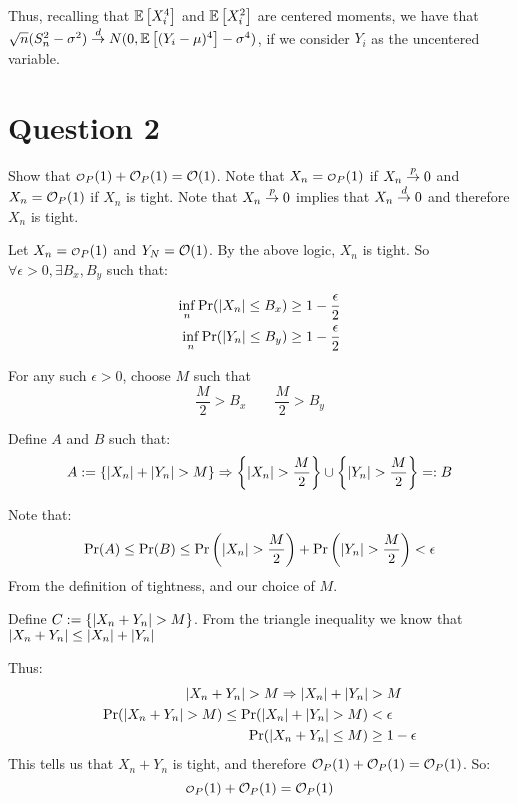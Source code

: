 \documentclass[12pt]{paper}
\begin{document}
Thus, recalling that $\mathbb{E} \left [ X_i^4 \right ]$ and $\mathbb{E} \left [ X_i^2 \right ]$ are centered moments, we have that  $\sqrt{n}(S_n^2-\sigma^2)\overset{d}{\to}N(0,\mathbb{E} \left [ (Y_i-\mu)^4 \right ]-\sigma^4)$, if we consider $Y_i$ as the uncentered variable.

\section*{Question 2}

Show that $\smallO_P(1) + \bigO_P(1) = \bigO(1)$.
\newline\newline
Note that $X_n = \smallO_P(1)$ if $X_n \overset{p}{\to} 0$ and $X_n = \mathcal{O}_P(1)$
if $X_n$ is tight. Note that $X_n \overset{p}{\to} 0$ implies that $X_n \overset{d}{\to}
0$ and therefore $X_n$ is tight.

Let $X_n = \smallO_P(1)$ and $Y_N = \mathcal{O}(1)$. By the above logic,
$X_n$ is tight. So $\forall \epsilon > 0, \exists B_x, B_y$ such that:

\begin{align*}
  \inf_n \Pr( \left \lvert X_n \right \rvert \leq B_x) &\geq 1- \frac{\epsilon}{2}\\
  \inf_n \Pr( \left \lvert Y_n \right \rvert \leq B_y) &\geq 1 - \frac{\epsilon}{2}
\end{align*}

For any such $\epsilon > 0$, choose $M$ such that
\begin{equation*}
  \frac{M}{2} > B_x \quad \quad \frac{M}{2} > B_y
\end{equation*}

Define $A$ and $B$ such that:
\begin{equation*}
  A := \{ \left \lvert X_n \right \rvert + \left \lvert Y_n \right \rvert > M \} \Rightarrow \left \{\left \lvert X_n \right \rvert >
    \frac{M}{2} \right\} \cup
\left\{\left \lvert Y_n \right \rvert > \frac{M}{2} \right\} =: B
\end{equation*}

Note that:
\begin{equation*}
  \Pr( A) \leq \Pr(B) \leq \Pr\left( \left \lvert X_n \right \rvert > \frac{M}{2}\right) + \Pr\left( \left \lvert Y_n \right \rvert > \frac{M}{2}\right) < \epsilon
\end{equation*}
From the definition of tightness, and our choice of $M$. 

Define $C := \{ \left \lvert  X_n + Y_n \right \rvert > M \}$. From the triangle inequality
we know that $\left \lvert X_n + Y_n \right \rvert \leq \left \lvert X_n \right \rvert + \left \lvert Y_n \right \rvert$

Thus:
\begin{align*}
  \left \lvert X_n + Y_n \right \rvert > M \Rightarrow \left \lvert X_n \right \rvert + \left \lvert Y_n \right \rvert &> M \\
  \Pr( \left \lvert X_n + Y_n  \right \rvert > M) \leq \Pr( \left \lvert X_n \right \rvert + \left \lvert Y_n \right \rvert > M) &< \epsilon\\
  \Pr( \left \lvert X_n + Y_n \right \rvert \leq M ) &\geq 1 - \epsilon
\end{align*}
 This tells us that
$X_n + Y_n$ is tight, and therefore
$\mathcal{O}_P(1) + \mathcal{O}_P(1) = \mathcal{O}_P(1)$. So:
\begin{equation*}
  \smallO_P(1) + \bigO_P(1) = \bigO_P(1) 
\end{equation*}
\end{document}

